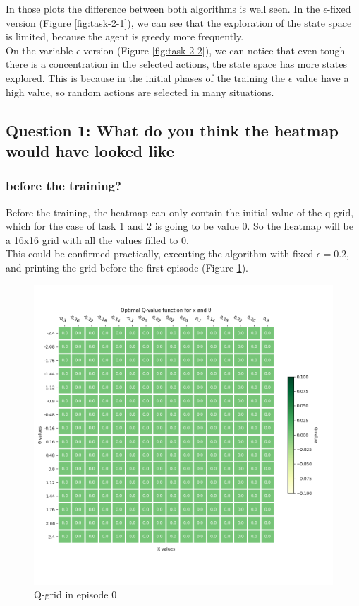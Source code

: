 \documentclass[12pt]{article}
\begin{document}
In those plots the difference between both algorithms is well seen. In the $\epsilon$-fixed version (Figure \ref{fig:task-2-1}), we can see that the exploration of the state space is limited, because the agent is greedy more frequently.\\

On the variable $\epsilon$ version (Figure \ref{fig:task-2-2}), we can notice that even tough there is a concentration in the selected actions, the state space has more states explored. This is because in the initial phases of the training the $\epsilon$ value have a high value, so random actions are selected in many situations.

\subsection{Question 1: What do you think the heatmap would have looked like}

\subsubsection{before the training?}

Before the training, the heatmap can only contain the initial value of the q-grid, which for the case of task 1 and 2 is going to be value 0. So the heatmap will be a 16x16 grid with all the values filled to 0. \\

This could be confirmed practically, executing the algorithm with fixed $\epsilon = 0.2$, and printing the grid before the first episode (Figure \ref{fig:q-1-1}).

\begin{figure}[h]
    \centering
    \includegraphics[scale=0.25]{exercise-3/plots/heatmap-fixed-0.2-ep-0.png}
    \caption{Q-grid in episode 0}
    \label{fig:q-1-1}
\end{figure}
\end{document}
